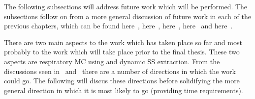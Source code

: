         The following subsections will address future work which will be performed. The subsections follow on from a more general discussion of future work in each of the previous chapters, which can be found here~, here~,
        here~, here~ and here~.
        
        There are two main aspects to the work which has taken place so far and most probably to the work which will take place prior to the final thesis. These two aspects are respiratory \gls{MC} using  and dynamic \gls{SS} extraction. From the discussions seen in~ and~ there are a number of directions in which the work could go. The following will discus these directions before solidifying the more general direction in which it is most likely to go (providing time requirements).
        
